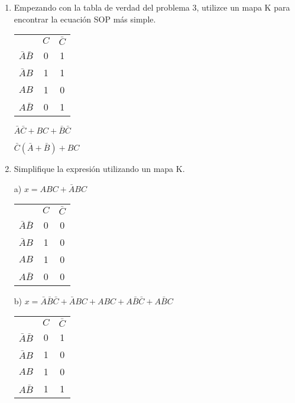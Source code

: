 \documentclass[a4paper, 12pt]{article}
\newcommand{\Pspace}{0.5cm}
\newcommand{\Aspace}{0.2cm}
\begin{document}
\begin{enumerate}
        \vspace{\Pspace}
        \item Empezando con la tabla de verdad del problema 3, utilizce un mapa K para encontrar la ecuación SOP más simple.
            \vspace{\Aspace} \par
            { \color{azul} 
               \begin{tabular}{ccc}
                    & $C$ & $\bar{C}$ \\
                    $\bar{A}\bar{B}$ & 0 & 1 \\
                    $\bar{A}B$ & 1 & 1 \\
                    $AB$ & 1 & 0 \\
                    $A \bar{B}$ & 0 & 1
                \end{tabular}
                
                \par $\bar{A}\bar{C} + BC + \bar{B}\bar{C}$
                \par $\bar{C}(\bar{A} + \bar{B}) + BC$
            }

            

        \newpage
        \item Simplifique la expresión utilizando un mapa K.
            \vspace{\Aspace} \par
            a) $x = ABC + \bar{A}BC$
            \par { \color{azul}
                \begin{tabular}{ccc}
                    & $C$ & $\bar{C}$ \\
                    $\bar{A}\bar{B}$ & 0 & 0 \\
                    $\bar{A}B$ & 1 & 0 \\
                    $AB$ & 1 & 0 \\
                    $A \bar{B}$ & 0 & 0
                \end{tabular}
            }

            \vspace{\Aspace} \par
            b) $x = \bar{A}\bar{B}\bar{C} + \bar{A}BC + ABC + A\bar{B}\bar{C} + A\bar{B}C$
            \par { \color{azul}
                \begin{tabular}{ccc}
                    & $C$ & $\bar{C}$ \\
                    $\bar{A}\bar{B}$ & 0 & 1 \\
                    $\bar{A}B$ & 1 & 0 \\
                    $AB$ & 1 & 0 \\
                    $A \bar{B}$ & 1 & 1
                \end{tabular}
            }




\end{enumerate}
\end{document}
